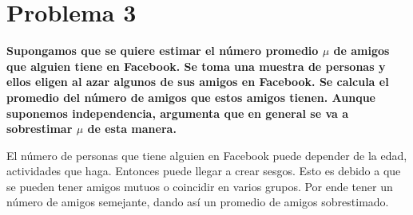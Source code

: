 \section*{Problema 3}

\textbf{Supongamos que se quiere estimar el número promedio
    $\mu$ de amigos que alguien tiene en Facebook. Se toma una muestra de
    personas y ellos eligen al azar algunos de sus amigos en Facebook. Se
    calcula el promedio del número de amigos que estos amigos tienen. Aunque
    suponemos independencia, argumenta que en general se va a sobrestimar
    $\mu$ de esta manera.}

El número de personas que tiene alguien en Facebook puede depender de la edad, actividades que haga. Entonces puede llegar a crear sesgos. Esto es debido a que se pueden tener amigos mutuos o coincidir en varios grupos. Por ende tener un número de amigos semejante, dando así un promedio de amigos sobrestimado.